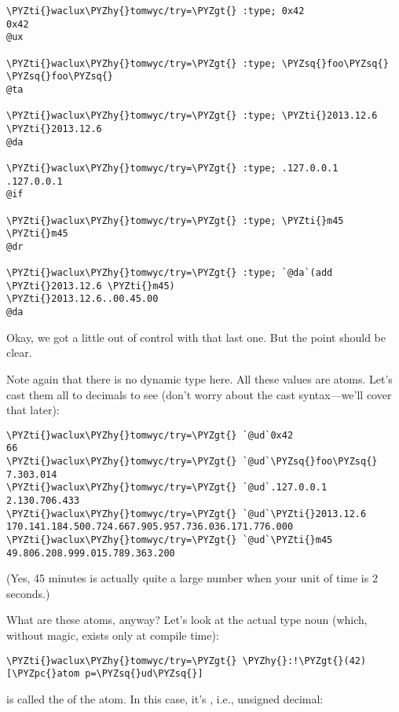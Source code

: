 \begin{framed_shaded}
\begin{Verbatim}[fontsize=\relsize{-2.5},fontseries=b,commandchars=\\\{\}]
\PYZti{}waclux\PYZhy{}tomwyc/try=\PYZgt{} :type; 0x42
0x42
@ux

\PYZti{}waclux\PYZhy{}tomwyc/try=\PYZgt{} :type; \PYZsq{}foo\PYZsq{}
\PYZsq{}foo\PYZsq{}
@ta

\PYZti{}waclux\PYZhy{}tomwyc/try=\PYZgt{} :type; \PYZti{}2013.12.6
\PYZti{}2013.12.6
@da

\PYZti{}waclux\PYZhy{}tomwyc/try=\PYZgt{} :type; .127.0.0.1
.127.0.0.1
@if

\PYZti{}waclux\PYZhy{}tomwyc/try=\PYZgt{} :type; \PYZti{}m45
\PYZti{}m45
@dr

\PYZti{}waclux\PYZhy{}tomwyc/try=\PYZgt{} :type; `@da`(add \PYZti{}2013.12.6 \PYZti{}m45)
\PYZti{}2013.12.6..00.45.00
@da
\end{Verbatim}
\end{framed_shaded}
Okay, we got a little out of control with that last one.  But the
point should be clear.

Note again that there is no dynamic type here.  All these values
are atoms.  Let's cast them all to decimals to see (don't worry
about the cast syntax---we'll cover that later):

\begin{framed_shaded}
\begin{Verbatim}[fontsize=\relsize{-2.5},fontseries=b,commandchars=\\\{\}]
\PYZti{}waclux\PYZhy{}tomwyc/try=\PYZgt{} `@ud`0x42
66
\PYZti{}waclux\PYZhy{}tomwyc/try=\PYZgt{} `@ud`\PYZsq{}foo\PYZsq{}
7.303.014
\PYZti{}waclux\PYZhy{}tomwyc/try=\PYZgt{} `@ud`.127.0.0.1
2.130.706.433
\PYZti{}waclux\PYZhy{}tomwyc/try=\PYZgt{} `@ud`\PYZti{}2013.12.6
170.141.184.500.724.667.905.957.736.036.171.776.000
\PYZti{}waclux\PYZhy{}tomwyc/try=\PYZgt{} `@ud`\PYZti{}m45
49.806.208.999.015.789.363.200
\end{Verbatim}
\end{framed_shaded}
(Yes, 45 minutes is actually quite a large number when your unit
of time is 2 seconds.)

What are these atoms, anyway?  Let's look at the actual type noun
(which, without magic, exists only at compile time):

\begin{framed_shaded}
\begin{Verbatim}[fontsize=\relsize{-2.5},fontseries=b,commandchars=\\\{\}]
\PYZti{}waclux\PYZhy{}tomwyc/try=\PYZgt{} \PYZhy{}:!\PYZgt{}(42)
[\PYZpc{}atom p=\PYZsq{}ud\PYZsq{}]
\end{Verbatim}
\end{framed_shaded}
 is called the  of the atom.  In this case, it's ,
i.e., unsigned decimal:

